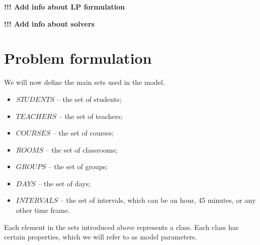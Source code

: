 \documentclass{article}
\begin{document}
\textbf{!!! Add info about LP formulation}

\textbf{!!! Add info about solvers}

\section{Problem formulation}

We will now define the main sets used in the model.

\begin{itemize}
  \setlength\itemsep{0.05em}
    \item $STUDENTS$ -- the set of students;
    \item $TEACHERS$ -- the set of teachers;
    \item $COURSES$ -- the set of courses;
    \item $ROOMS$ -- the set of classrooms;
    \item $GROUPS$ -- the set of groups;
    \item $DAYS$ -- the set of days;
    \item $INTERVALS$ -- the set of intervals, which can be an hour, 45 minutes, or any other time frame.
\end{itemize}

Each element in the sets introduced above represents a class. Each class has certain properties, which we will refer to as model parameters.
\end{document}

